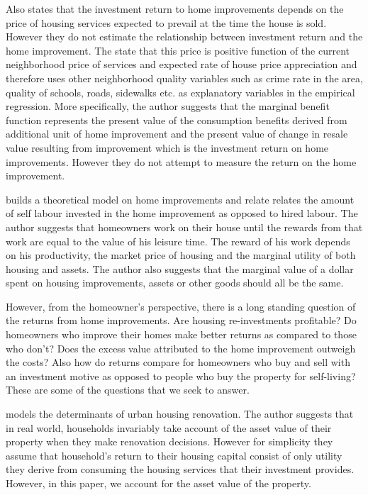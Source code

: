 Also \citet{boehm1986improvement} states that the investment return to home improvements depends on the price of housing services expected to prevail at the time the house is sold. However they do not estimate the relationship between investment return and the home improvement. The state that this price is positive function of the current neighborhood price of services and expected rate of house price appreciation and therefore uses other neighborhood quality variables such as crime rate in the area, quality of schools, roads, sidewalks etc. as explanatory variables in the empirical regression.   More specifically, the author suggests that the marginal benefit function represents the present value of the consumption benefits derived from additional unit of home improvement and the present value of change in resale value resulting from improvement which is the investment return on home improvements. However they do not attempt to measure the return on the home improvement. 



\citet{mendelsohn1977empirical} builds a theoretical model on home improvements and relate relates the amount of self labour invested in the home improvement as opposed to hired labour. The author suggests that homeowners work on their house until the rewards from that work are equal to the value of his leisure time. The reward of his work depends on his productivity, the market price of housing and the marginal utility of both housing and assets. The author also suggests that the marginal value of a dollar spent on housing improvements, assets or other goods should all be the same. 


However, from the homeowner’s perspective, there is a long standing question of the returns from home improvements. Are housing re-investments profitable? Do homeowners who improve their homes make better returns as compared to those who don't? Does the excess value attributed to the home improvement outweigh the costs? Also how do returns compare for homeowners who buy and sell with an investment motive as opposed to people who buy the property for self-living? These are some of the questions that we seek to answer.


\citet{helms2003understanding} models the determinants of urban housing renovation. The author suggests that in real world, households invariably take account of the asset value of their property when they make renovation decisions. However for simplicity they assume that household's return to their housing capital consist of only utility they derive from consuming the housing services that their investment provides. However, in this paper, we account for the asset value of the property.


